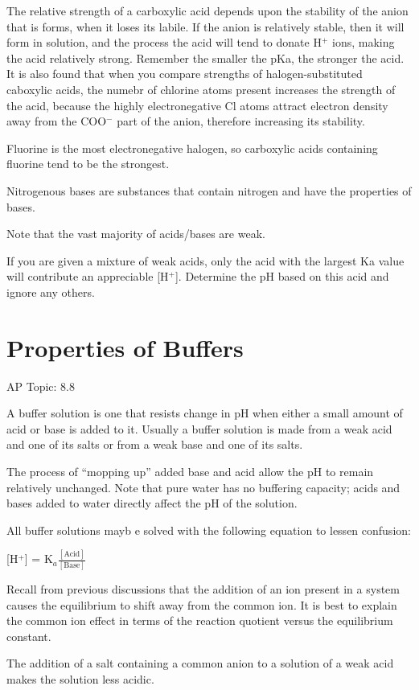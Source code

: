 \documentclass[../chem.tex]{subfiles}
\begin{document}
The relative strength of a carboxylic acid depends upon the stability of the anion that is forms, when it loses its labile. If the anion is relatively stable,
then it will form in solution, and the process the acid will tend to donate H$^+$ ions, making the acid relatively strong. Remember the smaller the pKa, the stronger the acid.
It is also found that when you compare strengths of halogen-substituted caboxylic acids, the numebr of chlorine atoms present increases the strength of the acid, because the 
highly electronegative Cl atoms attract electron density away from the COO$^-$ part of the anion, therefore increasing its stability.

Fluorine is the most electronegative halogen, so carboxylic acids containing fluorine tend to be the strongest.

Nitrogenous bases are substances that contain nitrogen and have the properties of bases.

Note that the vast majority of acids/bases are weak.

If you are given a mixture of weak acids, only the acid with the largest Ka value will contribute an appreciable [H$^+$]. Determine the pH based on this acid and ignore any others.
\section{Properties of Buffers}
AP Topic: 8.8

A buffer solution is one that resists change in pH when either a small amount of acid or base is added to it. Usually a buffer solution is 
made from a weak acid and one of its salts or from a weak base and one of its salts. 

The process of ``mopping up'' added base and acid allow the pH to remain relatively unchanged. Note that pure water has no buffering capacity; 
acids and bases added to water directly affect the pH of the solution.

All buffer solutions mayb e solved with the following equation to lessen confusion:
\begin{center}
    [H$^+$] = K$_a \frac{[\text{Acid}]}{[\text{Base}]}$
\end{center}

Recall from previous discussions that the addition of an ion present in a system causes the equilibrium to shift away from the common ion. 
It is best to explain the common ion effect in terms of the reaction quotient versus the equilibrium constant. 

The addition of a salt containing a common anion to a solution of a weak acid makes the solution less acidic.
\end{document}
